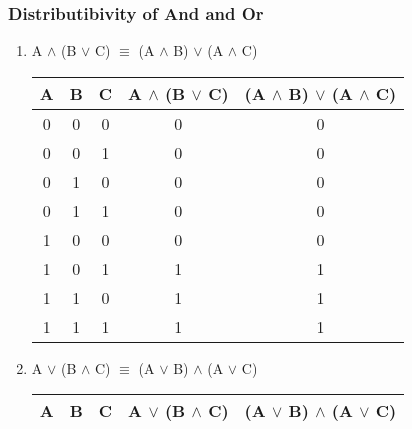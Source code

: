 \documentclass[12pt]{article}
\begin{document}
\subsubsection{Distributibivity of And and Or}

\begin{enumerate}



  \item A $\land$ (B $\lor$ C) $\equiv$ (A $\land$ B) $\lor$ (A $\land$ C)



\begin{center}

  \begin{tabular}{| c | c | c | c | c |}

    \hline

    A & B & C & A $\land$ (B $\lor$ C) & (A $\land$ B) $\lor$ (A $\land$ C) \\ \hline

    0 & 0 & 0 & 0 & 0 \\

    0 & 0 & 1 & 0 & 0 \\

    0 & 1 & 0 & 0 & 0 \\

    0 & 1 & 1 & 0 & 0 \\

    1 & 0 & 0 & 0 & 0 \\

    1 & 0 & 1 & 1 & 1 \\

    1 & 1 & 0 & 1 & 1 \\

    1 & 1 & 1 & 1 & 1 \\ \hline

  \end{tabular}

\end{center}



  \item A $\lor$ (B $\land$ C) $\equiv$ (A $\lor$ B) $\land$ (A $\lor$ C)



\begin{center}

  \begin{tabular}{| c | c | c | c | c |}

    \hline

    A & B & C & A $\lor$ (B $\land$ C) & (A $\lor$ B) $\land$ (A $\lor$ C) \\ \hline


\end{tabular}
\end{center}
\end{enumerate}
\end{document}
